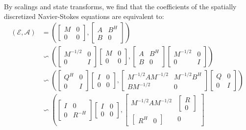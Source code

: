\documentclass[]{book}
\theoremstyle{definition}
\theoremstyle{definition}
\theoremstyle{definition}
\theoremstyle{definition}
\theoremstyle{remark}
\begin{document}
By scalings and state transforms, we find that the coefficients of the spatially discretized Navier-Stokes equations are equivalent to:
\begin{align*}
(\mathcal E, \mathcal A) &=
\left(
\begin{bmatrix} M & 0 \\ 0 & 0 \end{bmatrix}
,
\begin{bmatrix} A & B^H \\ B & 0 \end{bmatrix}
\right) \\
& \backsim 
\left(
\begin{bmatrix} M^{-1/2} & 0 \\ 0 & I \end{bmatrix}
\begin{bmatrix} M & 0 \\ 0 & 0 \end{bmatrix}
,
\begin{bmatrix} A & B^H \\ B & 0 \end{bmatrix}
\begin{bmatrix} M^{-1/2} & 0 \\ 0 & I \end{bmatrix}
\right) \\
& \backsim 
\left(
\begin{bmatrix} Q^H & 0 \\ 0 & I \end{bmatrix}
\begin{bmatrix} I & 0 \\ 0 & 0 \end{bmatrix}
,
\begin{bmatrix} M^{-1/2}AM^{-1/2} &  M^{-1/2}B^H \\ B M^{-1/2} & 0 \end{bmatrix}
\begin{bmatrix} Q & 0 \\ 0 & I \end{bmatrix}
\right) \\
& \backsim 
\left(
\begin{bmatrix} I & 0 \\ 0 & R^{-H} \end{bmatrix}
\begin{bmatrix} I & 0 \\ 0 & 0 \end{bmatrix}
,
\begin{bmatrix} M^{-1/2}AM^{-1/2} &  \begin{bmatrix} R \\ 0 \end{bmatrix} \\ \begin{bmatrix}R^H & 0\end{bmatrix} & 0 \end{bmatrix}

\end{align*}
\end{document}
